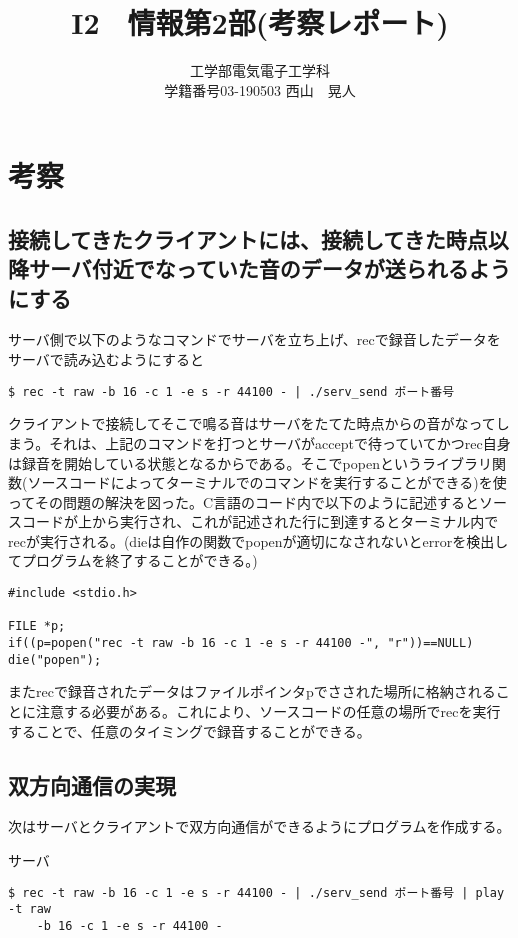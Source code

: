 \documentclass{jsarticle}
\title{I2　情報第2部(考察レポート)}
\author{工学部電気電子工学科　\\
学籍番号03-190503 西山　晃人}
\date{}
\begin{document}
\maketitle

\section{考察}
\subsection{接続してきたクライアントには、接続してきた時点以降サーバ付近でなっていた音のデータが送られるようにする}
サーバ側で以下のようなコマンドでサーバを立ち上げ、recで録音したデータをサーバで読み込むようにすると
\begin{lstlisting}[basicstyle=\ttfamily\footnotesize, frame=single]
$ rec -t raw -b 16 -c 1 -e s -r 44100 - | ./serv_send ポート番号
\end{lstlisting}

クライアントで接続してそこで鳴る音はサーバをたてた時点からの音がなってしまう。それは、上記のコマンドを打つとサーバがacceptで待っていてかつrec自身は録音を開始している状態となるからである。そこでpopenというライブラリ関数(ソースコードによってターミナルでのコマンドを実行することができる)を使ってその問題の解決を図った。C言語のコード内で以下のように記述するとソースコードが上から実行され、これが記述された行に到達するとターミナル内でrecが実行される。(dieは自作の関数でpopenが適切になされないとerrorを検出してプログラムを終了することができる。)
\begin{lstlisting}[basicstyle=\ttfamily\footnotesize, frame=single]
#include <stdio.h>

FILE *p;
if((p=popen("rec -t raw -b 16 -c 1 -e s -r 44100 -", "r"))==NULL) die("popen");
\end{lstlisting}
またrecで録音されたデータはファイルポインタpでさされた場所に格納されることに注意する必要がある。これにより、ソースコードの任意の場所でrecを実行することで、任意のタイミングで録音することができる。

\subsection{双方向通信の実現}
次はサーバとクライアントで双方向通信ができるようにプログラムを作成する。

サーバ
\begin{lstlisting}[basicstyle=\ttfamily\footnotesize, frame=single]
$ rec -t raw -b 16 -c 1 -e s -r 44100 - | ./serv_send ポート番号 | play -t raw 
	-b 16 -c 1 -e s -r 44100 -
\end{lstlisting}
\end{document}
